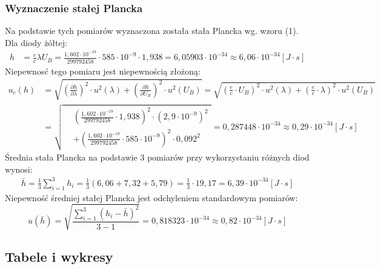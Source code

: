 \documentclass[polish, 11pt, a4paper]{article}
\begin{document}
	\subsubsection{Wyznaczenie stałej Plancka}
		Na podstawie tych pomiarów wyznaczona została stała Plancka wg. wzoru (1). Dla diody żółtej:
		\begin{align*}
			h	&=	\frac{e}{c}\lambda U_B	=	\frac{1,602\cdot 10^{-19}}{299792458}\cdot 585\cdot 10^{-9}\cdot 1,938	=	6,05903\cdot 10^{-34}	\approx 6,06\cdot 10^{-34} [J\cdot s]			
		\end{align*}
		Niepewnosć tego pomiaru jest niepewnością złożoną:
		\begin{align*}
			u_c(h)	&=\sqrt{\left(\frac{\partial h}{\partial \lambda}\right)^2\cdot u^2(\lambda)+\left(\frac{\partial h}{\partial U_B}\right)^2\cdot u^2(U_B)}
					=\sqrt{\left(\frac{e}{c}\cdot U_B\right)^2\cdot u^2(\lambda) + \left(\frac{e}{c}\cdot \lambda\right)^2\cdot u^2(U_B)}\\[6pt]
					&=\sqrt{
						\begin{aligned}
						&\left(\frac{1,602\cdot 10^{-19}}{299792458}\cdot 1,938\right)^2\cdot (2,9\cdot 10^{-9})^2\\
						&+\left(\frac{1,602\cdot 10^{-19}}{299792458}\cdot 585\cdot 10^{-9}\right)^2\cdot 0,092^2
						\end{aligned}
					} = 0,287448\cdot 10^{-34}	\approx 0,29\cdot 10^{-34} [J\cdot s]
		\end{align*}
		Średnia stała Plancka na podstawie 3 pomiarów przy wykorzystaniu różnych diod wynosi:
		\begin{align*}
			\bar{h} = \frac{1}{3}\sum_{i=1}^{3}h_i=\frac{1}{3}(6,06 + 7,32 + 5,79)=\frac{1}{3}\cdot 19,17 = 6,39\cdot 10^{-34} [J\cdot s]			
		\end{align*}
		Niepewność średniej stałej Plancka jest odchyleniem standardowym pomiarów:
		\begin{displaymath}
			u(\bar{h})=\sqrt{\frac{\sum_{i=1}^{3}(h_i-\bar{h})^2}{3-1}} = 0,818323\cdot 10^{-34}	\approx 0,82 \cdot 10^{-34} [J\cdot s]
		\end{displaymath}
	\newpage
	\subsection{Tabele i wykresy}
		
\end{document}
